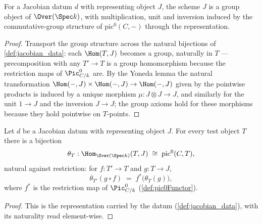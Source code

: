 \begin{definition}
  \label{def:jacobian_data_grp}
  \leanok
  For a Jacobian datum \(d\) with representing object \(J\), the scheme \(J\)
  is a group object of \(\Over(\Spec k)\), with multiplication, unit and
  inversion induced by the commutative-group structure of
  \(\mathrm{pic}^0(C, -)\) through the representation.
\end{definition}
\begin{proof}
  \leanok
  Transport the group structure across the natural bijections of
  \ref{def:jacobian_data}: each \(\Hom(T, J)\) becomes a group, naturally in
  \(T\) --- precomposition with any \(T' \to T\) is a group homomorphism
  because the restriction maps of \(\Pic^0_{C/k}\) are. By the Yoneda lemma the
  natural transformation
  \(\Hom(-, J) \times \Hom(-, J) \to \Hom(-, J)\) given by the pointwise
  products is induced by a unique morphism \(\mu : J \otimes J \to J\), and
  similarly for the unit \(1 \to J\) and the inversion \(J \to J\); the group
  axioms hold for these morphisms because they hold pointwise on
  \(T\)-points.
\end{proof}

\begin{lemma}
  \label{lem:jacobian_data_homEquiv}
  \leanok
  Let \(d\) be a Jacobian datum with representing object \(J\). For every test
  object \(T\) there is a bijection
  \[
    \theta_T : \Hom_{\Over(\Spec k)}(T, J) \;\cong\; \mathrm{pic}^0(C, T),
  \]
  natural against restriction: for \(f : T' \to T\) and \(g : T \to J\),
  \[
    \theta_{T'}(g \circ f) \;=\; f^*\bigl(\theta_T(g)\bigr),
  \]
  where \(f^*\) is the restriction map of \(\Pic^0_{C/k}\)
  (\ref{def:pic0Functor}).
\end{lemma}
\begin{proof}
  \leanok
  This is the representation carried by the datum (\ref{def:jacobian_data}),
  with its naturality read element-wise.
\end{proof}

